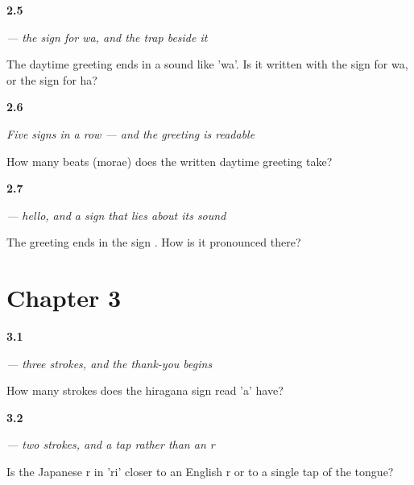 \noindent\begin{minipage}[t]{\linewidth}
\raggedright
\hypertarget{review-JA-W01-wa-particle}{\textbf{2.5}} \emph{ — the sign for \emph{wa}, and the trap beside it}\par
\small The daytime greeting ends in a sound like 'wa'. Is it written with the sign for wa, or the sign for ha?
\end{minipage}\par\medskip

\noindent\begin{minipage}[t]{\linewidth}
\raggedright
\hypertarget{review-JA-W01-konnichiwa-read-beats}{\textbf{2.6}} \emph{Five signs in a row — and the greeting is readable}\par
\small How many beats (morae) does the written daytime greeting take?
\end{minipage}\par\medskip

\noindent\begin{minipage}[t]{\linewidth}
\raggedright
\hypertarget{review-JA-C01-konnichiwa-particle}{\textbf{2.7}} \emph{ — hello, and a sign that lies about its sound}\par
\small The greeting ends in the sign . How is it pronounced there?
\end{minipage}\par\medskip

\section*{Chapter 3}

\noindent\begin{minipage}[t]{\linewidth}
\raggedright
\hypertarget{review-JA-W03-a-strokes}{\textbf{3.1}} \emph{ — three strokes, and the thank-you begins}\par
\small How many strokes does the hiragana sign read 'a' have?
\end{minipage}\par\medskip

\noindent\begin{minipage}[t]{\linewidth}
\raggedright
\hypertarget{review-JA-W03-ri-tap}{\textbf{3.2}} \emph{ — two strokes, and a tap rather than an r}\par
\small Is the Japanese r in 'ri' closer to an English r or to a single tap of the tongue?
\end{minipage}\par\medskip

